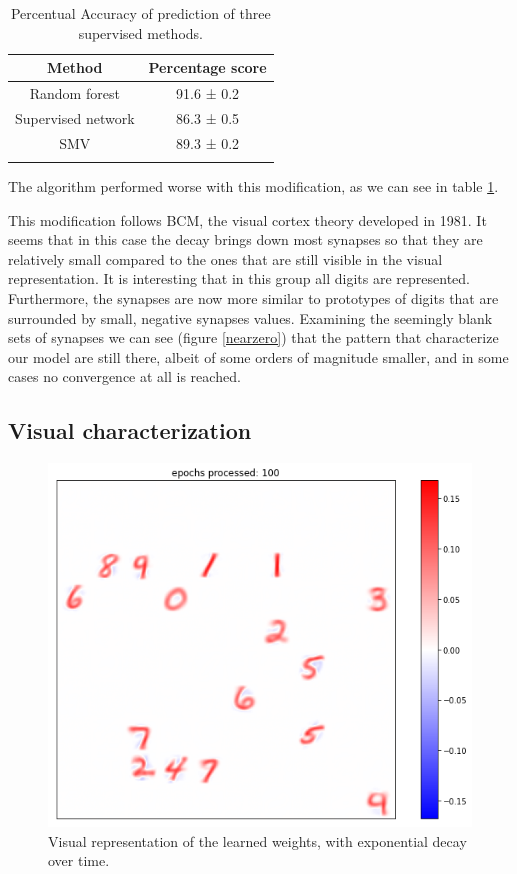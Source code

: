 \documentclass[a4paper]{report}
\begin{document}
\begin{table}[h!]
  \begin{center}
    \begin{tabular}{c|c} %
      \textbf{Method} & \textbf{Percentage score}\\
      \hline
      Random forest & 91.6  ± 0.2\\
      Supervised network & 86.3 ± 0.5\\
      SMV & 89.3 ± 0.2\\
        \label{decayT}
    \end{tabular}
  \end{center}
  \caption{Percentual Accuracy of prediction of three supervised methods.}
\end{table}

The algorithm performed worse with this modification, as we can see in table \ref{decayT}.

This modification follows BCM, the visual cortex theory developed in 1981.
It seems that in this case the decay brings down most synapses so that they are relatively small compared to the ones that are still visible in the visual representation.
It is interesting that in this group all digits are represented.
Furthermore, the synapses are now more similar to prototypes of digits that are surrounded by small, negative synapses values.
Examining the seemingly blank sets of synapses we can see (figure \ref{nearzero}) that the pattern that characterize our model are still there, albeit of some orders of magnitude smaller, and in some cases no convergence at all is reached.

\subsection{Visual characterization}

\begin{figure} [H]
\centering
\includegraphics [width=12cm ] {h/cento.png}
\caption{Visual representation of the learned weights, with exponential decay over time.}
\label{decay}
\end{figure}
\end{document}
